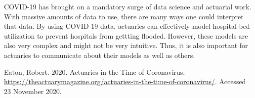 \documentclass[12pt]{article}
\begin{document}
\begin{flushleft}
COVID-19 has brought on a mandatory surge of data science and actuarial work. With 
massive amounts of data to use, there are many ways one could interpret that data. 
By using COVID-19 data, actuaries can effectively model hospital bed utilization 
to prevent hospitals from gettting flooded. However, these models are also 
very complex and might not be very intuitive. Thus, it is also important for 
actuaries to communicate about their models as well as others. 

\newpage
\begin{thebibliography}{98}

   Eaton, Robert. 2020. Actuaries in the Time of Coronavirus. \href{https://theactuarymagazine.org/actuaries-in-the-time-of-coronavirus/}{https://theactuarymagazine.org/actuaries-in-the-time-of-coronavirus/}. Accessed 23 November 2020.

\end{thebibliography}

\end{flushleft}
\end{document}
